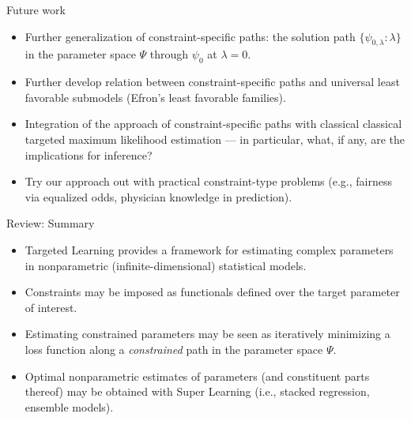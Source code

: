 \documentclass[12pt,t]{beamer}
\begin{document}
\begin{frame}[c]{Future work}

\begin{center}
\begin{itemize}
  \itemsep12pt
  \item Further generalization of constraint-specific paths: the solution path
    $\{\psi_{0, \lambda}: \lambda\}$ in the parameter space $\Psi$ through
    $\psi_0$ at $\lambda = 0$.
  \item Further develop relation between constraint-specific paths and universal
    least favorable submodels (Efron's least favorable families).
  \item Integration of the approach of constraint-specific paths with classical
    classical targeted maximum likelihood estimation --- in particular, what, if
    any, are the implications for inference?
  \item Try our approach out with practical constraint-type problems (e.g.,
    fairness via equalized odds, physician knowledge in prediction).
\end{itemize}
\end{center}

\note{
}

\end{frame}


\begin{frame}[c]{Review: Summary}

\begin{center}
\begin{itemize}
  \itemsep12pt
  \item Targeted Learning provides a framework for estimating complex parameters
    in nonparametric (infinite-dimensional) statistical models.
  \item Constraints may be imposed as functionals defined over the target
    parameter of interest.
  \item Estimating constrained parameters may be seen as iteratively minimizing
    a loss function along a \textit{constrained} path in the parameter space
    $\Psi$.
  \item Optimal nonparametric estimates of parameters (and constituent parts
    thereof) may be obtained with Super Learning (i.e., stacked regression,
    ensemble models).
\end{itemize}
\end{center}


\end{frame}
\end{document}
